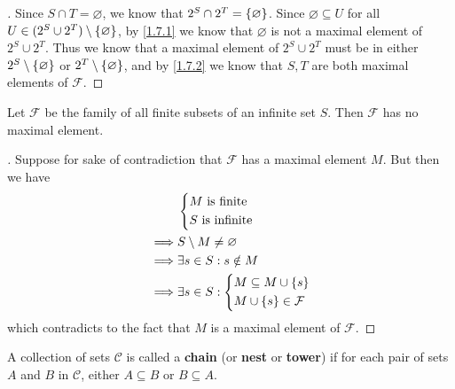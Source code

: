 \begin{proof}[]
	Since \(S \cap T = \varnothing\), we know that \(2^S \cap 2^T = \left\lbrace\varnothing\right\rbrace\).
	Since \(\varnothing \subseteq U\) for all \(U \in (2^S \cup 2^T) \setminus \left\lbrace\varnothing\right\rbrace\), by \cref{1.7.1} we know that \(\varnothing\) is not a maximal element of \(2^S \cup 2^T\).
	Thus we know that a maximal element of \(2^S \cup 2^T\) must be in either \(2^S \setminus \left\lbrace\varnothing\right\rbrace\) or \(2^T \setminus \left\lbrace\varnothing\right\rbrace\), and by \cref{1.7.2} we know that \(S, T\) are both maximal elements of \(\mathcal{F}\).
\end{proof}

\begin{eg}\label{1.7.4}
	Let \(\mathcal{F}\) be the family of all finite subsets of an infinite set \(S\).
	Then \(\mathcal{F}\) has no maximal element.
\end{eg}

\begin{proof}[]
	Suppose for sake of contradiction that \(\mathcal{F}\) has a maximal element \(M\).
	But then we have
	\begin{align*}
		         & \begin{dcases}
			           M \text{ is finite} \\
			           S \text{ is infinite}
		           \end{dcases}                            \\
		\implies & S \setminus M \neq \varnothing                  \\
		\implies & \exists s \in S : s \notin M                    \\
		\implies & \exists s \in S : \begin{dcases}
			                             M \subseteq M \cup \left\lbrace s\right\rbrace \\
			                             M \cup \left\lbrace s\right\rbrace \in \mathcal{F}
		                             \end{dcases}
	\end{align*}
	which contradicts to the fact that \(M\) is a maximal element of \(\mathcal{F}\).
\end{proof}

\begin{defn}\label{1.7.5}
	A collection of sets \(\mathcal{C}\) is called a \textbf{chain} (or \textbf{nest} or \textbf{tower}) if for each pair of sets \(A\) and \(B\) in \(\mathcal{C}\), either \(A \subseteq B\) or \(B \subseteq A\).
\end{defn}

